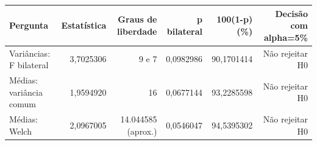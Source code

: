 \begin{tabular}{lrrrrr}
\toprule
Pergunta & Estatística & Graus de liberdade & p bilateral & 100(1-p) (\%) & Decisão com alpha=5\% \\
\midrule
Variâncias: F bilateral & 3,7025306 & 9 e 7 & 0,0982986 & 90,1701414 & Não rejeitar H0 \\
Médias: variância comum & 1,9594920 & 16 & 0,0677144 & 93,2285598 & Não rejeitar H0 \\
Médias: Welch & 2,0967005 & 14.044585 (aprox.) & 0,0546047 & 94,5395302 & Não rejeitar H0 \\
\bottomrule
\end{tabular}
